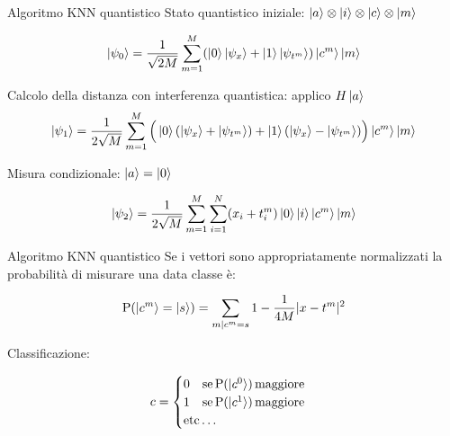 \documentclass{beamer}
\begin{document}
    \begin{frame}{Algoritmo KNN quantistico}
        Stato quantistico iniziale: $\ket{a} \otimes \ket{i} \otimes \ket{c} \otimes \ket{m}$

		\begin{equation*}
			\ket{\psi_0} = \frac{1}{\sqrt{2M}} \sum_{m=1}^M 
			(\ket{0}\ket{\psi_x}+\ket{1}\ket{\psi_{t^m}})\ket{c^m}\ket{m}
		\end{equation*}

		Calcolo della distanza con interferenza quantistica: applico $H\ket{a}$
		\begin{equation*}
			\ket{\psi_1} = \frac{1}{2\sqrt{M}}\sum_{m=1}^M 
			\Big( \ket{0}(\ket{\psi_x}+\ket{\psi_{t^m}}) + \ket{1}(\ket{\psi_x}-\ket{\psi_{t^m}}) \Big) \ket{c^m}\ket{m}
		\end{equation*}
	
		Misura condizionale: $\ket{a} = \ket{0}$

		\begin{equation*}
			\ket{\psi_2} = \frac{1}{2\sqrt{M}} \sum_{m=1}^M \sum_{i=1}^N
			(x_i+t_i^m)\ket{0}\ket{i}\ket{c^m}\ket{m}
		\end{equation*}
    \end{frame}

    \begin{frame}{Algoritmo KNN quantistico}
        Se i vettori sono appropriatamente normalizzati 
        la probabilità di misurare una data classe è:

		\begin{equation*}
			\text{P}(\ket{c^m} = \ket{s}) = \sum_{m|c^m=s} 
			1 - \frac{1}{4M} |x-t^m|^2
		\end{equation*}

		Classificazione:

		\begin{equation*}
			c = \begin{cases}
			0 \quad \text{se}\, \text{P}(\ket{c^0})\, \text{maggiore} \\
			1 \quad \text{se}\, \text{P}(\ket{c^1})\, \text{maggiore} \\
			\text{etc}\ldots
		\end{cases}
        \end{equation*}
    \end{frame}
\end{document}
